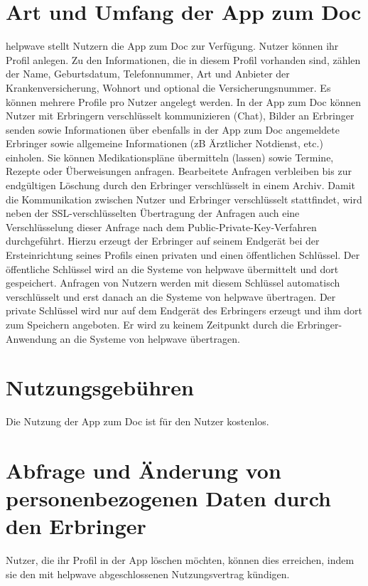 \documentclass[10pt]{article}
\begin{document}
\section{Art und Umfang der App zum Doc}
helpwave stellt Nutzern die App zum Doc zur Verfügung. Nutzer können ihr Profil anlegen. Zu den Informationen, die
in diesem Profil vorhanden sind, zählen der Name, Geburtsdatum, Telefonnummer, Art und Anbieter der Krankenversicherung, Wohnort und optional die Versicherungsnummer. Es können mehrere Profile pro Nutzer angelegt werden. In der App zum Doc können Nutzer mit Erbringern verschlüsselt kommunizieren (Chat), Bilder an Erbringer senden sowie Informationen über ebenfalls in der App zum Doc angemeldete Erbringer sowie allgemeine Informationen (zB Ärztlicher Notdienst, etc.) einholen. Sie können Medikationspläne übermitteln (lassen) sowie Termine, Rezepte oder Überweisungen anfragen. Bearbeitete Anfragen verbleiben bis zur endgültigen Löschung durch den Erbringer verschlüsselt in einem Archiv.
Damit die Kommunikation zwischen Nutzer und Erbringer verschlüsselt stattfindet, wird neben der SSL-verschlüsselten
Übertragung der Anfragen auch eine Verschlüsselung dieser Anfrage nach dem Public-Private-Key-Verfahren durchgeführt.
Hierzu erzeugt der Erbringer auf seinem Endgerät bei der Ersteinrichtung seines Profils einen privaten und einen öffentlichen Schlüssel. Der öffentliche Schlüssel wird an die Systeme von helpwave übermittelt und dort gespeichert. Anfragen von
Nutzern werden mit diesem Schlüssel automatisch verschlüsselt und erst danach an die Systeme von helpwave übertragen.
Der private Schlüssel wird nur auf dem Endgerät des Erbringers erzeugt und ihm dort zum Speichern angeboten. Er wird zu
keinem Zeitpunkt durch die Erbringer-Anwendung an die Systeme von helpwave übertragen.



\section{Nutzungsgebühren}
Die Nutzung der App zum Doc ist für den Nutzer kostenlos.

\section{Abfrage und Änderung von personenbezogenen Daten durch den Erbringer}
Nutzer, die ihr Profil in der App löschen möchten, können dies erreichen, indem sie den mit helpwave abgeschlossenen
Nutzungsvertrag kündigen.
\end{document}
